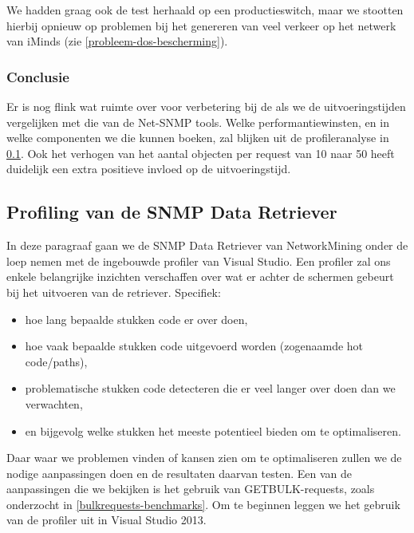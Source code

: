 We hadden graag ook de test herhaald op een productieswitch,
maar we stootten hierbij opnieuw op problemen bij het genereren van veel verkeer op het netwerk van iMinds (zie \cref{probleem-dos-bescherming}).


\subsubsection{Conclusie}

Er is nog flink wat ruimte over voor verbetering bij de \nwmretriever{} als we de uitvoeringstijden vergelijken met die van de Net-SNMP tools.
Welke performantiewinsten, en in welke componenten we die kunnen boeken, zal blijken uit de profileranalyse in \cref{profiling}.
Ook het verhogen van het aantal objecten per request van 10 naar 50 heeft duidelijk een extra positieve invloed op de uitvoeringstijd.

\subsection{Profiling van de SNMP Data Retriever}
\label{profiling}


In deze paragraaf gaan we de SNMP Data Retriever van NetworkMining onder de loep nemen met de ingebouwde profiler van Visual Studio.
Een profiler zal ons enkele belangrijke inzichten verschaffen over wat er achter de schermen gebeurt bij het uitvoeren van de retriever.
Specifiek:

\begin{itemize}
	\item hoe lang bepaalde stukken code er over doen,
	\item hoe vaak bepaalde stukken code uitgevoerd worden (zogenaamde hot code/paths),
	\item problematische stukken code detecteren die er veel langer over doen dan we verwachten,
	\item en bijgevolg welke stukken het meeste potentieel bieden om te optimaliseren.
\end{itemize}

Daar waar we problemen vinden of kansen zien om te optimaliseren zullen we de nodige aanpassingen doen en de resultaten daarvan testen.
Een van de aanpassingen die we bekijken is het gebruik van GETBULK-requests, zoals onderzocht in \cref{bulkrequests-benchmarks}.
Om te beginnen leggen we het gebruik van de profiler uit in Visual Studio 2013.

